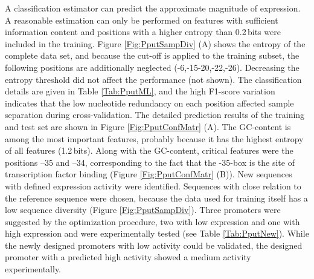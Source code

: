 \documentclass[utf8]{frontiersSCNS} %
\begin{document}
A classification estimator can predict the approximate magnitude of expression. A reasonable estimation can only be performed on features with sufficient information content and positions with a higher entropy than 0.2\,bits were included in the training. Figure \ref{Fig:PputSampDiv} (A) shows the entropy of the complete data set, and because the cut-off is applied to the training subset, the following positions are additionally neglected (\mbox{-6,-15-20,-22,-26}). Decreasing the entropy threshold did not affect the performance (not shown). The classification details are given in Table \ref{Tab:PputML}, and the high F1-score variation indicates that the low nucleotide redundancy on each position affected sample separation during cross-validation. The detailed prediction results of the training and test set are shown in Figure \ref{Fig:PputConfMatr} (A). The GC-content is among the most important features, probably because it has the highest entropy of all features (1.2\,bits). Along with the GC-content, critical features were the positions –35 and –34, corresponding to the fact that the -35-box is the site of transcription factor binding \citep{Paget2015} (Figure \ref{Fig:PputConfMatr} (B)). New sequences with defined expression activity were identified. Sequences with close relation to the reference sequence were chosen, because the data used for training itself has a low sequence diversity (Figure \ref{Fig:PputSampDiv}). Three promoters were suggested by the optimization procedure, two with low expression and one with high expression and were experimentally tested (see Table \ref{Tab:PputNew}). While the newly designed promoters with low activity could be validated, the designed promoter with a predicted high activity showed a medium activity experimentally.


\end{document}
